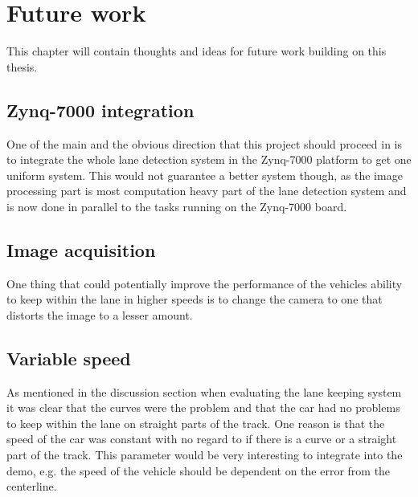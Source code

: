 \chapter{Future work}
This chapter will contain thoughts and ideas for future work building on this thesis.\\

\section{Zynq-7000 integration}
One of the main and the obvious direction that this project should proceed in is to integrate the whole lane detection system in the Zynq-7000 platform to get one uniform system. This would not guarantee a better system though, as the image processing part is most computation heavy part of the lane detection system and is now done in parallel to the tasks running on the Zynq-7000 board.\\

\section{Image acquisition}
One thing that could potentially improve the performance of the vehicles ability to keep within the lane in higher speeds is to change the camera to one that distorts the image to a lesser amount.\\

\section{Variable speed}
As mentioned in the discussion section when evaluating the lane keeping system it was clear that the curves were the problem and that the car had no problems to keep within the lane on straight parts of the track. One reason is that the speed of the car was constant with no regard to if there is a curve or a straight part of the track. This parameter would be very interesting to integrate into the demo, e.g. the speed of the vehicle should be dependent on the error from the centerline.